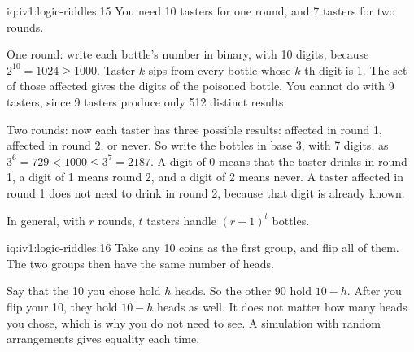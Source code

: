\begin{solution}{iq:iv1:logic-riddles:15}
You need 10 tasters for one round, and 7 tasters for two rounds.

One round: write each bottle's number in binary, with 10 digits, because $2^{10} = 1024 \ge 1000$. Taster $k$ sips from every bottle whose $k$-th digit is 1. The set of those affected gives the digits of the poisoned bottle. You cannot do with 9 tasters, since 9 tasters produce only 512 distinct results.

Two rounds: now each taster has three possible results: affected in round 1, affected in round 2, or never. So write the bottles in base 3, with 7 digits, as $3^6 = 729 < 1000 \le 3^7 = 2187$. A digit of 0 means that the taster drinks in round 1, a digit of 1 means round 2, and a digit of 2 means never. A taster affected in round 1 does not need to drink in round 2, because that digit is already known.

In general, with $r$ rounds, $t$ tasters handle $(r + 1)^t$ bottles.

\end{solution}

\begin{solution}{iq:iv1:logic-riddles:16}
Take any 10 coins as the first group, and flip all of them. The two groups then have the same number of heads.

Say that the 10 you chose hold $h$ heads. So the other 90 hold $10 - h$. After you flip your 10, they hold $10 - h$ heads as well. It does not matter how many heads you chose, which is why you do not need to see. A simulation with random arrangements gives equality each time.

\end{solution}

